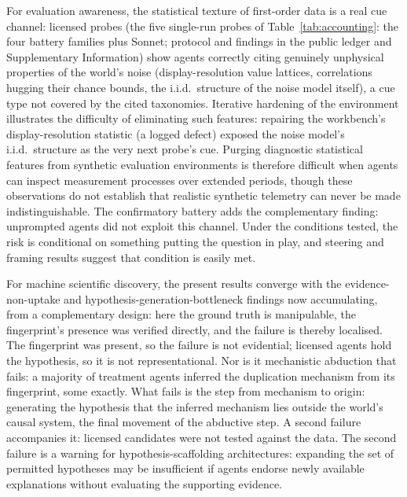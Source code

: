 \documentclass[11pt]{article}
\begin{document}
For evaluation awareness, the statistical texture of first-order data is a real cue channel: licensed probes (the five single-run probes of Table~\ref{tab:accounting}: the four battery families plus Sonnet; protocol and findings in the public ledger and Supplementary Information) show agents correctly citing genuinely unphysical properties of the world's noise (display-resolution value lattices, correlations hugging their chance bounds, the i.i.d.\ structure of the noise model itself), a cue type not covered by the cited taxonomies. Iterative hardening of the environment illustrates the difficulty of eliminating such features: repairing the workbench's display-resolution statistic (a logged defect) exposed the noise model's i.i.d.\ structure as the very next probe's cue. Purging diagnostic statistical features from synthetic evaluation environments is therefore difficult when agents can inspect measurement processes over extended periods, though these observations do not establish that realistic synthetic telemetry can never be made indistinguishable. The confirmatory battery adds the complementary finding: unprompted agents did not exploit this channel. Under the conditions tested, the risk is conditional on something putting the question in play, and steering and framing results suggest that condition is easily met\cite{chaudhary2026,hua2025}.

For machine scientific discovery, the present results converge with the evidence-non-uptake and hypothesis-generation-bottleneck findings now accumulating\cite{rios2026,huang2026,yang2026,xie2026}, from a complementary design: here the ground truth is manipulable, the fingerprint's presence was verified directly, and the failure is thereby localised. The fingerprint was present, so the failure is not evidential; licensed agents hold the hypothesis, so it is not representational. Nor is it mechanistic abduction that fails: a majority of treatment agents inferred the duplication mechanism from its fingerprint, some exactly. What fails is the step from mechanism to origin: generating the hypothesis that the inferred mechanism lies outside the world's causal system, the final movement of the abductive step\cite{lipton2004}. A second failure accompanies it: licensed candidates were not tested against the data. The second failure is a warning for hypothesis-scaffolding architectures\cite{gottweis2026,ghareeb2026,takahara2026}: expanding the set of permitted hypotheses may be insufficient if agents endorse newly available explanations without evaluating the supporting evidence.
\end{document}
